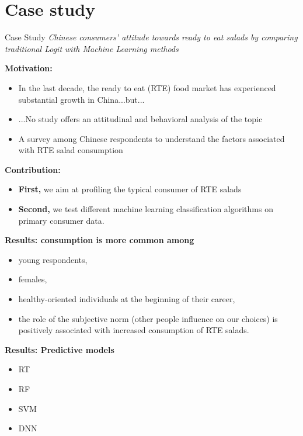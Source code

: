 \documentclass[12pt]{beamer}
\begin{document}
\section{Case study}

\begin{frame}{Case Study}
\textit{Chinese consumers’ attitude towards ready to eat salads by comparing traditional Logit with Machine Learning methods}
\end{frame}

\begin{frame}
	\footnotesize
	\textbf{Motivation:}
	\begin{itemize}
	\item In the last decade, the ready to eat (RTE) food market has experienced substantial growth in China...but...
	\item ...No study offers an attitudinal and behavioral analysis of the topic
	\item A survey among Chinese respondents to understand the factors associated with RTE salad consumption
	\end{itemize}

	\textbf{Contribution:}
	\begin{itemize}
	\item \textbf{First,} we aim at profiling the typical consumer of RTE salads
	\item \textbf{Second,} we test different machine learning classification algorithms on primary consumer data.
	\end{itemize}


 \end{frame}


 \begin{frame}
 	\footnotesize
\textbf{Results: consumption is more common among}
\begin{itemize}
	\item young respondents,  
	\item females,
	\item healthy-oriented individuals at the beginning of their career,
	\item the role of the subjective norm (other people influence on our choices) is positively associated with increased consumption of RTE salads. 
\end{itemize}		

\textbf{Results: Predictive models}
\begin{itemize}
	\item RT
	\item RF
	\item SVM
	\item DNN
\end{itemize}		 	
\end{frame}
\end{document}
